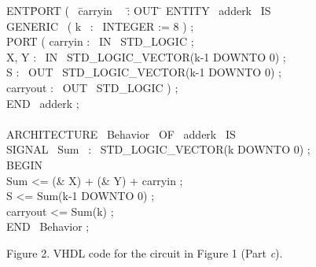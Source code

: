 \begin{center} %

\parbox{12.5cm}{
\begin{tabbing}
ENT\=PORT ( ~\=carryin~~ \= : OUT \=\kill
ENTITY ~adderk ~IS\\
\>GENERIC ~( k ~: ~INTEGER := 8 ) ;\\
\>PORT ( \>carryin \>: ~IN ~STD\_LOGIC ;\\
\>\>X, Y \>: ~IN ~STD\_LOGIC\_VECTOR(k-1 DOWNTO 0) ;\\
\>\>S \>: ~OUT ~STD\_LOGIC\_VECTOR(k-1 DOWNTO 0) ;\\
\>\>carryout \>: ~OUT ~STD\_LOGIC ) ;\\
END ~adderk ;\\
\\
ARCHITECTURE ~Behavior ~OF ~adderk ~IS\\
\>SIGNAL ~Sum ~: ~STD\_LOGIC\_VECTOR(k DOWNTO 0) ;\\
BEGIN\\
\>Sum <= (\textquotesingle \& X) + (\textquotesingle \& Y) + carryin ;\\
\>S <= Sum(k-1 DOWNTO 0) ;\\
\>carryout <= Sum(k) ;\\
END ~Behavior ;
\end{tabbing} }

Figure 2.  VHDL code for the circuit in Figure 1 (Part {\it c}).
\end{center}
